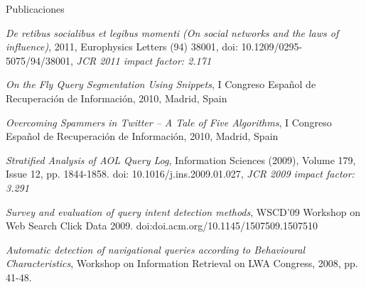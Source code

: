 \begin{rubric}{Publicaciones}

  \entry*[2011]
  \emph{De retibus socialibus et legibus momenti (On social networks and the laws of influence)}, 2011, Europhysics Letters (94) 38001, doi: 10.1209/0295-5075/94/38001, \emph{JCR 2011 impact factor: 2.171}

  \entry*[2010]
  \emph{On the Fly Query Segmentation Using Snippets},  I Congreso Español de Recuperación de Información, 2010, Madrid, Spain

  \entry*
  \emph{Overcoming Spammers in Twitter -- A Tale of Five Algorithms},  I Congreso Español de Recuperación de Información, 2010, Madrid, Spain


  \entry*[2009]
  \emph{Stratified Analysis of AOL Query Log},  Information Sciences (2009), Volume 179, Issue 12, pp. 1844-1858. doi: 10.1016/j.ins.2009.01.027, \emph{JCR 2009 impact factor: 3.291}

  \entry*
  \emph{Survey and evaluation of query intent detection methods}, WSCD'09 Workshop on Web Search Click Data 2009. doi:doi.acm.org/10.1145/1507509.1507510

  \entry*[2008]
  \emph{Automatic detection of navigational queries according to Behavioural Characteristics}, Workshop on Information Retrieval on LWA Congress, 2008, pp. 41-48.

\end{rubric}
